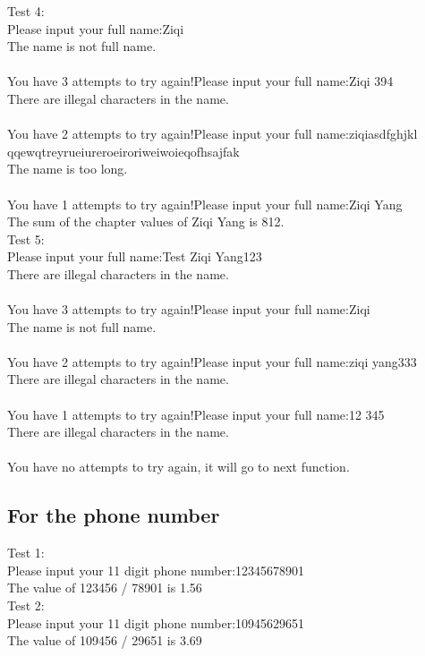 \documentclass[12pt]{article}
\begin{document}
	\noindent Test 4:\\
	Please input your full name:Ziqi\\
	The name is not full name.\\\\
	You have 3 attempts to try again!Please input your full name:Ziqi 394\\
	There are illegal characters in the name.\\\\	
	You have 2 attempts to try again!Please input your full name:ziqiasdfghjkl qqewqtreyrueiureroeiroriweiwoieqofhsajfak\\
	The name is too long.\\\\	
	You have 1 attempts to try again!Please input your full name:Ziqi Yang\\
	The sum of the chapter values of Ziqi Yang is 812.\\
	
	\noindent Test 5:\\
	Please input your full name:Test Ziqi Yang123\\
	There are illegal characters in the name.\\\\	
	You have 3 attempts to try again!Please input your full name:Ziqi\\
	The name is not full name.\\\\	
	You have 2 attempts to try again!Please input your full name:ziqi yang333\\
	There are illegal characters in the name.\\\\	
	You have 1 attempts to try again!Please input your full name:12 345\\
	There are illegal characters in the name.\\\\	
	You have no attempts to try again, it will go to next function.
	
	
	\subsection{For the phone number}
	\noindent Test 1:\\
	Please input your 11 digit phone number:12345678901\\
	The value of 123456 / 78901 is 1.56\\
	
	\noindent Test 2:\\
	Please input your 11 digit phone number:10945629651\\
	The value of 109456 / 29651 is 3.69\\
	
\end{document}
